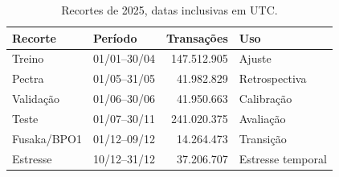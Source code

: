 \begin{table}[htbp]
\centering\small
\caption{Recortes de 2025, datas inclusivas em UTC.}
\label{tab:recortes}
\begin{tabular}{@{}llrl@{}}
\toprule
Recorte & Período & Transações & Uso \\
\midrule
Treino & 01/01--30/04 & 147.512.905 & Ajuste \\
Pectra & 01/05--31/05 & 41.982.829 & Retrospectiva \\
Validação & 01/06--30/06 & 41.950.663 & Calibração \\
Teste & 01/07--30/11 & 241.020.375 & Avaliação \\
Fusaka/BPO1 & 01/12--09/12 & 14.264.473 & Transição \\
Estresse & 10/12--31/12 & 37.206.707 & Estresse temporal \\
\bottomrule
\end{tabular}
\end{table}

